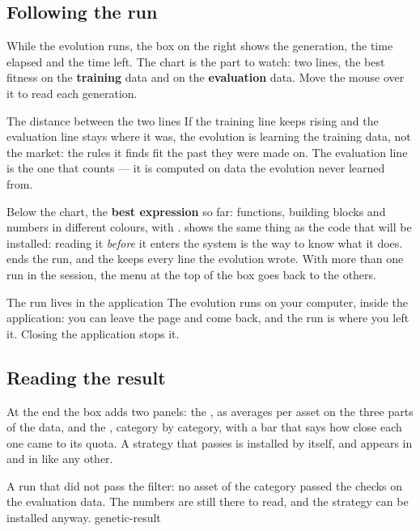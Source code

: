 \subsection{Following the run}

While the evolution runs, the box on the right shows the generation, the time
elapsed and the time left. The chart is the part to watch: two lines, the
best fitness on the \textbf{training} data and on the \textbf{evaluation}
data. Move the mouse over it to read each generation.

\begin{perche}{The distance between the two lines}
If the training line keeps rising and the evaluation line stays where it
was, the evolution is learning the training data, not the market: the rules
it finds fit the past they were made on. The evaluation line is the one that
counts --- it is computed on data the evolution never learned from.
\end{perche}

\noindent
Below the chart, the \textbf{best expression} so far: functions, building
blocks and numbers in different colours, with .
 shows the same thing as the code that will be
installed: reading it \emph{before} it enters the system is the way to know
what it does.  ends the run, and the  keeps
every line the evolution wrote. With more than one run in the session, the
menu at the top of the box goes back to the others.

\begin{nota}{The run lives in the application}
The evolution runs on your computer, inside the application: you can leave
the page and come back, and the run is where you left it. Closing the
application stops it.
\end{nota}

\subsection{Reading the result}

At the end the box adds two panels: the , as averages per asset
on the three parts of the data, and the , category by
category, with a bar that says how close each one came to its quota. A
strategy that passes is installed by itself, and appears in
 and in  like any other.

  {A run that did not pass the filter: no asset of the category passed the
   checks on the evaluation data. The numbers are still there to read, and
   the strategy can be installed anyway.}
  {genetic-result}

